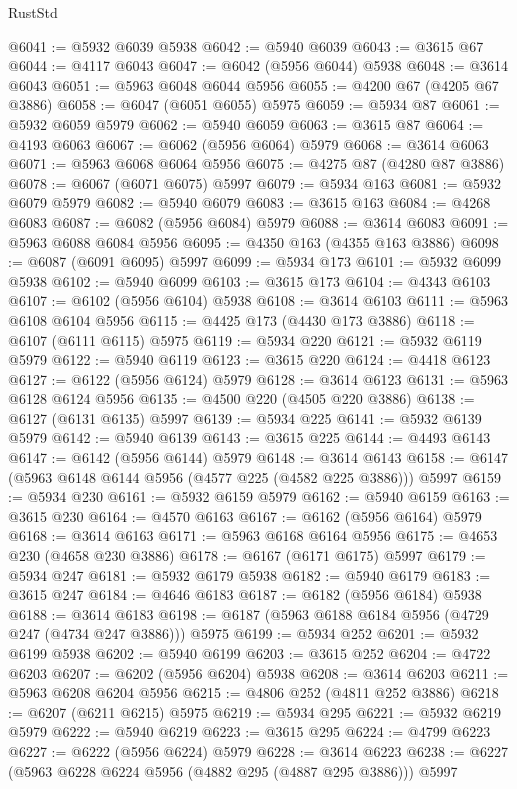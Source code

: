 \begin{lexlean}{RustStd}
\begin{coremodule}
@6041 := @5932 @6039 @5938
@6042 := @5940 @6039
@6043 := @3615 @67
@6044 := @4117 @6043
@6047 := @6042 (@5956 @6044) @5938
@6048 := @3614 @6043
@6051 := @5963 @6048 @6044 @5956
@6055 := @4200 @67 (@4205 @67 @3886)
@6058 := @6047 (@6051 @6055) @5975
@6059 := @5934 @87
@6061 := @5932 @6059 @5979
@6062 := @5940 @6059
@6063 := @3615 @87
@6064 := @4193 @6063
@6067 := @6062 (@5956 @6064) @5979
@6068 := @3614 @6063
@6071 := @5963 @6068 @6064 @5956
@6075 := @4275 @87 (@4280 @87 @3886)
@6078 := @6067 (@6071 @6075) @5997
@6079 := @5934 @163
@6081 := @5932 @6079 @5979
@6082 := @5940 @6079
@6083 := @3615 @163
@6084 := @4268 @6083
@6087 := @6082 (@5956 @6084) @5979
@6088 := @3614 @6083
@6091 := @5963 @6088 @6084 @5956
@6095 := @4350 @163 (@4355 @163 @3886)
@6098 := @6087 (@6091 @6095) @5997
@6099 := @5934 @173
@6101 := @5932 @6099 @5938
@6102 := @5940 @6099
@6103 := @3615 @173
@6104 := @4343 @6103
@6107 := @6102 (@5956 @6104) @5938
@6108 := @3614 @6103
@6111 := @5963 @6108 @6104 @5956
@6115 := @4425 @173 (@4430 @173 @3886)
@6118 := @6107 (@6111 @6115) @5975
@6119 := @5934 @220
@6121 := @5932 @6119 @5979
@6122 := @5940 @6119
@6123 := @3615 @220
@6124 := @4418 @6123
@6127 := @6122 (@5956 @6124) @5979
@6128 := @3614 @6123
@6131 := @5963 @6128 @6124 @5956
@6135 := @4500 @220 (@4505 @220 @3886)
@6138 := @6127 (@6131 @6135) @5997
@6139 := @5934 @225
@6141 := @5932 @6139 @5979
@6142 := @5940 @6139
@6143 := @3615 @225
@6144 := @4493 @6143
@6147 := @6142 (@5956 @6144) @5979
@6148 := @3614 @6143
@6158 := @6147 (@5963 @6148 @6144 @5956 (@4577 @225 (@4582 @225 @3886))) @5997
@6159 := @5934 @230
@6161 := @5932 @6159 @5979
@6162 := @5940 @6159
@6163 := @3615 @230
@6164 := @4570 @6163
@6167 := @6162 (@5956 @6164) @5979
@6168 := @3614 @6163
@6171 := @5963 @6168 @6164 @5956
@6175 := @4653 @230 (@4658 @230 @3886)
@6178 := @6167 (@6171 @6175) @5997
@6179 := @5934 @247
@6181 := @5932 @6179 @5938
@6182 := @5940 @6179
@6183 := @3615 @247
@6184 := @4646 @6183
@6187 := @6182 (@5956 @6184) @5938
@6188 := @3614 @6183
@6198 := @6187 (@5963 @6188 @6184 @5956 (@4729 @247 (@4734 @247 @3886))) @5975
@6199 := @5934 @252
@6201 := @5932 @6199 @5938
@6202 := @5940 @6199
@6203 := @3615 @252
@6204 := @4722 @6203
@6207 := @6202 (@5956 @6204) @5938
@6208 := @3614 @6203
@6211 := @5963 @6208 @6204 @5956
@6215 := @4806 @252 (@4811 @252 @3886)
@6218 := @6207 (@6211 @6215) @5975
@6219 := @5934 @295
@6221 := @5932 @6219 @5979
@6222 := @5940 @6219
@6223 := @3615 @295
@6224 := @4799 @6223
@6227 := @6222 (@5956 @6224) @5979
@6228 := @3614 @6223
@6238 := @6227 (@5963 @6228 @6224 @5956 (@4882 @295 (@4887 @295 @3886))) @5997

\end{coremodule}
\end{lexlean}

